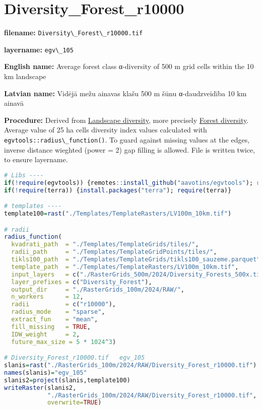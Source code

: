 \documentclass[
]{book}
\newcommand{\passthrough}[1]{#1}
\begin{document}
\section{Diversity\_Forest\_r10000}\label{ch06.105}

\textbf{filename:} \passthrough{\lstinline!Diversity\_Forest\_r10000.tif!}

\textbf{layername:} \passthrough{\lstinline!egv\_105!}

\textbf{English name:} Average forest class α-diversity of 500 m grid cells within the 10 km landscape

\textbf{Latvian name:} Vidējā mežu ainavas klašu 500 m šūnu α-daudzveidība 10 km ainavā

\textbf{Procedure:} Derived from \hyperref[Ch05.04]{Landscape diversity}, more precisely
\hyperref[Ch05.04.02]{Forest diversity}. Average value of 25 ha
cells diversity index values calculated with \passthrough{\lstinline!egvtools::radius\_function()!}. To
guard against missing values at the edges, inverse distance wieghted (power = 2)
gap filling is allowed. File is written twice, to ensure layername.

\begin{lstlisting}[language=R]
# Libs ----
if(!require(egvtools)) {remotes::install_github("aavotins/egvtools"); require(egvtools)}
if(!require(terra)) {install.packages("terra"); require(terra)}

# templates ----
template100=rast("./Templates/TemplateRasters/LV100m_10km.tif")

# radii
radius_function(
  kvadrati_path  = "./Templates/TemplateGrids/tiles/",
  radii_path     = "./Templates/TemplateGridPoints/tiles/",
  tikls100_path  = "./Templates/TemplateGrids/tikls100_sauzeme.parquet",
  template_path  = "./Templates/TemplateRasters/LV100m_10km.tif",
  input_layers   = c("./RasterGrids_500m/2024/Diversity_Forests_500x.tif"),
  layer_prefixes = c("Diversity_Forest"),
  output_dir     = "./RasterGrids_100m/2024/RAW/",
  n_workers      = 12,
  radii          = c("r10000"),
  radius_mode    = "sparse",
  extract_fun    = "mean",
  fill_missing   = TRUE,
  IDW_weight     = 2,
  future_max_size = 5 * 1024^3)

# Diversity_Forest_r10000.tif   egv_105
slanis=rast("./RasterGrids_100m/2024/RAW/Diversity_Forest_r10000.tif")
names(slanis)="egv_105"
slanis2=project(slanis,template100)
writeRaster(slanis2,
            "./RasterGrids_100m/2024/RAW/Diversity_Forest_r10000.tif",
            overwrite=TRUE)
\end{lstlisting}
\end{document}
